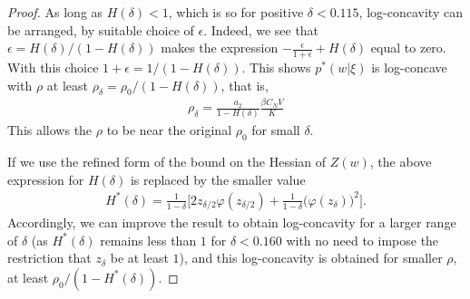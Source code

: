 \documentclass{article}
\numberwithin{equation}{section}
\theoremstyle{Lemma}
\theoremstyle{Corollary}
\theoremstyle{Theorem}
\theoremstyle{Remark}
\begin{document}
\begin{proof}
As long as $H(\delta) < 1$, which is so for positive $\delta < 0.115$, log-concavity can be arranged, by suitable choice of $\epsilon$. Indeed, 
we see that $\epsilon = H(\delta)/(1-H(\delta))$ makes the expression $-\frac{\epsilon}{1+\epsilon} + H(\delta)$ equal to zero. With this choice $1+\epsilon = 1/(1-H(\delta))$. This shows $p^*(w|\xi)$ is log-concave with $\rho$ at least $\rho_\delta = \rho_0/(1-H(\delta))$, that is,
\begin{align}
\rho_\delta = \frac{a_2}{1-H(\delta)} \frac{\beta C_N V}{K}
\end{align}
This allows the $\rho$ to be near the original $\rho_0$ for small $\delta$. 

If we use the refined form of the bound on the Hessian of $Z(w)$, the above expression for $H(\delta)$ is replaced by the smaller value
    \begin{align}
H^*(\delta)=  \frac{1}{1-\delta} \Big[2z_{\delta/2}\varphi(z_{\delta/2})+\frac{1}{1-\delta}\big(\varphi(z_\delta)\big)^2\Big].
\end{align}
Accordingly, we can improve the result to obtain log-concavity for a larger range of $\delta$ (as $H^*(\delta)$ remains less than $1$ for $\delta < 0.160$ with no need to impose the restriction that $z_\delta$ be at least $1$), and this log-concavity is obtained for smaller $\rho$, at least $\rho_0/(1-H^*(\delta))$.
\end{proof}
\end{document}

